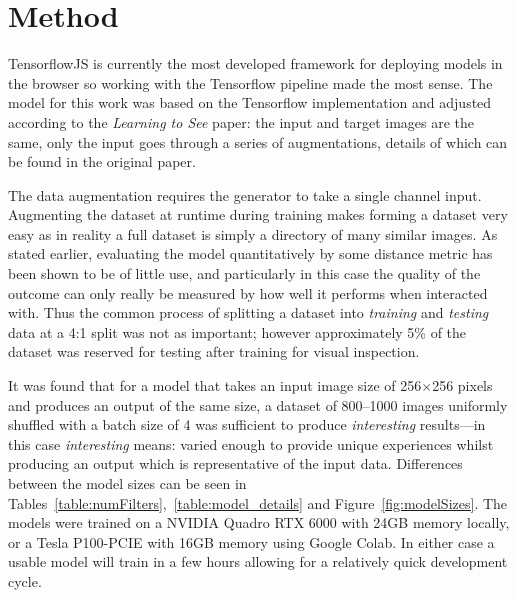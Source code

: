 \documentclass{article}
\begin{document}
\section{Method}
TensorflowJS is currently the most developed framework for deploying models in the browser so working with the Tensorflow pipeline made the most sense. The model for this work was based on the Tensorflow implementation\cite{tf_p2p} and adjusted according to the \textit{Learning to See} paper: the input and target images are the same, only the input goes through a series of augmentations, details of which can be found in the original paper\cite{2003.00902}.

The data augmentation requires the generator to take a single channel input. Augmenting the dataset at runtime during training makes forming a dataset very easy as in reality a full dataset is simply a directory of many similar images. As stated earlier, evaluating the model quantitatively by some distance metric has been shown to be of little use, and particularly in this case the quality of the outcome can only really be measured by how well it performs when interacted with. Thus the common process of splitting a dataset into \textit{training} and \textit{testing} data at a 4:1 split was not as important; however approximately 5\% of the dataset was reserved for testing after training for visual inspection.

It was found that for a model that takes an input image size of 256$\times$256 pixels and produces an output of the same size, a dataset of 800--1000 images uniformly shuffled with a batch size of 4 was sufficient to produce \textit{interesting} results---in this case \textit{interesting} means: varied enough to provide unique experiences whilst producing an output which is representative of the input data. Differences between the model sizes can be seen in Tables~\ref{table:numFilters},~\ref{table:model_details} and Figure~\ref{fig:modelSizes}. The models were trained on a NVIDIA Quadro RTX 6000 with 24GB memory locally, or a Tesla P100-PCIE with 16GB memory using Google Colab. In either case a usable model will train in a few hours allowing for a relatively quick development cycle.
\end{document}

